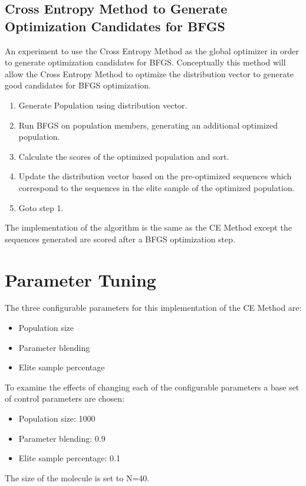 \documentclass[conference,letterpaper]{IEEEtran}
\begin{document}
\newpage
\subsection{Cross Entropy Method to Generate Optimization Candidates for BFGS}
\par An experiment to use the Cross Entropy Method as the global optimizer in order to generate optimization candidates for BFGS. Conceptually this method will allow the Cross Entropy Method to optimize the distribution vector to generate good candidates for BFGS optimization.
\begin{enumerate}
    \item Generate Population using distribution vector.
    \item Run BFGS on population members, generating an additional optimized population.
    \item Calculate the scores of the optimized population and sort.
    \item Update the distribution vector based on the pre-optimized sequences which correspond to the sequences in the elite sample of the optimized population.
    \item Goto step 1.
\end{enumerate}

The implementation of the algorithm is the same as the CE Method except the sequences generated are scored after a BFGS optimization step.

\section{Parameter Tuning}
\par The three configurable parameters for this implementation of the CE Method are:
\begin{itemize}[topsep=0pt]
    \item Population size
    \item Parameter blending
    \item Elite sample percentage
\end{itemize}
To examine the effects of changing each of the configurable parameters a base set of control parameters are chosen:
\begin{itemize}[topsep=0pt]
    \item Population size: 1000
    \item Parameter blending: 0.9
    \item Elite sample percentage: 0.1
\end{itemize}
The size of the molecule is set to N=40.
\end{document}
